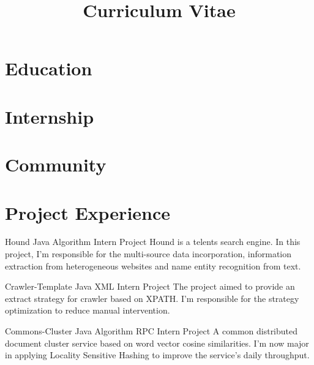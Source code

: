 \documentclass[11pt,a4paper]{moderncv}
\title{Curriculum Vitae}
\begin{document}
\maketitle

\section{Education}

\section{Internship}

\section{Community}

\section{Project Experience}

{Hound}
{Java Algorithm}
{Intern Project}{}
{
Hound is a telents search engine. In this project, I'm responsible for the multi-source data incorporation, information extraction from heterogeneous websites and name entity recognition from text.
}

\vspace*{0.2\baselineskip}
{Crawler-Template}
{Java XML}
{Intern Project}{}
{The project aimed to provide an extract strategy for crawler based on XPATH. I'm responsible for the strategy optimization to reduce manual intervention.}

\vspace*{0.2\baselineskip}
{Commons-Cluster}
{Java Algorithm RPC}
{Intern Project}{}
{A common distributed document cluster service based on word vector cosine similarities. I'm now major in applying Locality Sensitive Hashing to improve the service's daily throughput.}
\end{document}
